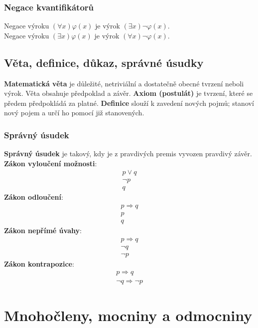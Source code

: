 \documentclass[12pt, a4paper]{article}
\begin{document}
\subsubsection*{Negace kvantifikátorů}
Negace výroku $(\forall x) \varphi (x) $ je výrok $(\exists x) \neg \varphi (x)$.\\
Negace výroku $(\exists x) \varphi (x) $ je výrok $ (\forall x) \neg \varphi (x)$.\\

\subsection*{Věta, definice, důkaz, správné úsudky}
\textbf{Matematická věta} je důležité, netriviální a dostatečně obecné tvrzení neboli výrok. Věta obsahuje předpoklad a závěr.
\textbf{Axiom (postulát)} je tvrzení, které se předem předpokládá za platné. 
\textbf{Definice} slouží k zavedení nových pojmů; stanoví nový pojem a určí ho pomocí již stanovených.
\subsubsection*{Správný úsudek}
\textbf{Správný úsudek} je takový, kdy je z pravdivých premis vyvozen pravdivý závěr.\\
\textbf{Zákon vyloučení možnosti}:
\begin{gather*}
 p \lor q \\ \neg p \\ \hline q
\end{gather*}
\textbf{Zákon odloučení}:
\begin{gather*}
p \Rightarrow q \\ p \\ \hline q
\end{gather*}
\textbf{Zákon nepřímé úvahy}:
\begin{gather*}
p \Rightarrow q \\ \neg q \\ \hline \neg p
\end{gather*}
\textbf{Zákon kontrapozice}:
\begin{gather*}
p \Rightarrow q \\ \hline \neg q \Rightarrow \neg p
\end{gather*}
\pagebreak

\section{Mnohočleny, mocniny a odmocniny}
\end{document}
